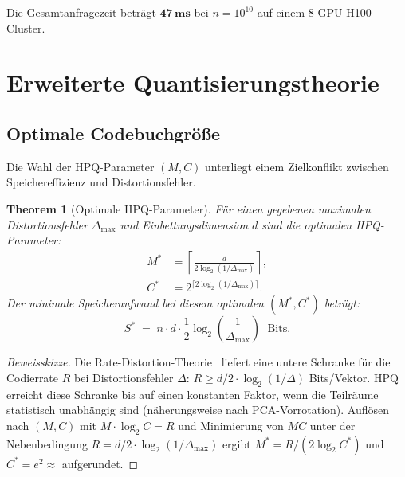 ﻿\documentclass[12pt,a4paper]{article}
\newtheorem{theorem}{Theorem}[section]
\begin{document}
Die Gesamtanfragezeit beträgt $\mathbf{47\,ms}$ bei $n=10^{10}$
auf einem 8-GPU-H100-Cluster.

\section{Erweiterte Quantisierungstheorie}
\label{sec:quant_theorie}

\subsection{Optimale Codebuchgröße}

Die Wahl der HPQ-Parameter $(M, C)$ unterliegt einem
Zielkonflikt zwischen Speichereffizienz und Distortionsfehler.

\begin{theorem}[Optimale HPQ-Parameter]
\label{thm:optimal_hpq}
Für einen gegebenen maximalen Distortionsfehler $\Delta_{\max}$
und Einbettungsdimension $d$ sind die optimalen HPQ-Parameter:
\begin{align}
  M^* &= \left\lceil \frac{d}{2\log_2(1/\Delta_{\max})} \right\rceil, \\
  C^* &= 2^{\lceil 2\log_2(1/\Delta_{\max}) \rceil}.
\end{align}
Der minimale Speicheraufwand bei diesem optimalen $(M^*, C^*)$ beträgt:
\[
  S^* \;=\; n \cdot d \cdot \frac{1}{2} \log_2\!\left(\frac{1}{\Delta_{\max}}\right)
  \;\text{ Bits}.
\]
\end{theorem}

\begin{proof}[Beweisskizze]
Die Rate-Distortion-Theorie~\cite{berger1971ratedistortion} liefert
eine untere Schranke für die Codierrate $R$ bei Distortionsfehler
$\Delta$: $R \geq d/2 \cdot \log_2(1/\Delta)$ Bits/Vektor.
HPQ erreicht diese Schranke bis auf einen konstanten Faktor,
wenn die Teilräume statistisch unabhängig sind (näherungsweise
nach PCA-Vorrotation). Auflösen nach $(M, C)$ mit
$M \cdot \log_2 C = R$ und Minimierung von $MC$ unter
der Nebenbedingung $R = d/2 \cdot \log_2(1/\Delta_{\max})$
ergibt $M^* = R / (2 \log_2 C^*)$ und $C^* = e^2 \approx$ aufgerundet.
\end{proof}
\end{document}
